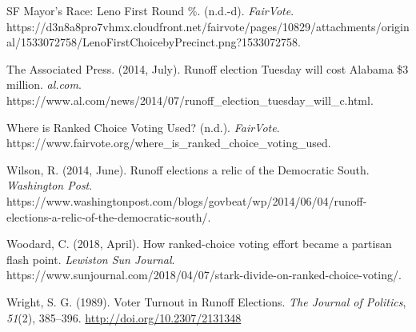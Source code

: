 \documentclass[12pt,twoside]{reedthesis}
\begin{document}
\leavevmode\hypertarget{ref-noauthor_sf_nodate-2}{}%
SF Mayor's Race: Leno First Round \%. (n.d.-d). \emph{FairVote}. https://d3n8a8pro7vhmx.cloudfront.net/fairvote/pages/10829/attachments/original/1533072758/LenoFirstChoicebyPrecinct.png?1533072758.

\leavevmode\hypertarget{ref-the_associated_press_runoff_2014}{}%
The Associated Press. (2014, July). Runoff election Tuesday will cost Alabama \$3 million. \emph{al.com}. https://www.al.com/news/2014/07/runoff\_election\_tuesday\_will\_c.html.

\leavevmode\hypertarget{ref-noauthor_where_nodate}{}%
Where is Ranked Choice Voting Used? (n.d.). \emph{FairVote}. https://www.fairvote.org/where\_is\_ranked\_choice\_voting\_used.

\leavevmode\hypertarget{ref-wilson_runoff_2014}{}%
Wilson, R. (2014, June). Runoff elections a relic of the Democratic South. \emph{Washington Post}. https://www.washingtonpost.com/blogs/govbeat/wp/2014/06/04/runoff-elections-a-relic-of-the-democratic-south/.

\leavevmode\hypertarget{ref-woodard_how_2018}{}%
Woodard, C. (2018, April). How ranked-choice voting effort became a partisan flash point. \emph{Lewiston Sun Journal}. https://www.sunjournal.com/2018/04/07/stark-divide-on-ranked-choice-voting/.

\leavevmode\hypertarget{ref-wright_voter_1989}{}%
Wright, S. G. (1989). Voter Turnout in Runoff Elections. \emph{The Journal of Politics}, \emph{51}(2), 385--396. \url{http://doi.org/10.2307/2131348}


\end{document}
